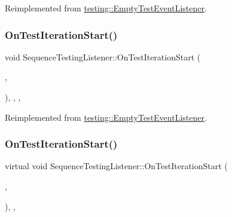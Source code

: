 Reimplemented from \mbox{\hyperlink{classtesting_1_1_empty_test_event_listener_a31edf103561e8b4d747656bc2d927661}{testing\+::\+Empty\+Test\+Event\+Listener}}.

\mbox{\label{class_sequence_testing_listener_a31ffb1bb77e88fff266511b1d8427e20}} 
\subsubsection{\texorpdfstring{OnTestIterationStart()}{OnTestIterationStart()}\hspace{0.1cm}{\footnotesize\ttfamily [2/3]}}
{\footnotesize\ttfamily void Sequence\+Testing\+Listener\+::\+On\+Test\+Iteration\+Start (\begin{DoxyParamCaption}\item[{const \mbox{\hyperlink{classtesting_1_1_unit_test}{Unit\+Test}} \&}]{,  }\item[{int}]{ }\end{DoxyParamCaption})\hspace{0.3cm}{\ttfamily [inline]}, {\ttfamily [override]}, {\ttfamily [protected]}, {\ttfamily [virtual]}}



Reimplemented from \mbox{\hyperlink{classtesting_1_1_empty_test_event_listener_a31edf103561e8b4d747656bc2d927661}{testing\+::\+Empty\+Test\+Event\+Listener}}.

\mbox{\label{class_sequence_testing_listener_a345641262fa10cc4b251ac54116db74b}} 
\subsubsection{\texorpdfstring{OnTestIterationStart()}{OnTestIterationStart()}\hspace{0.1cm}{\footnotesize\ttfamily [3/3]}}
{\footnotesize\ttfamily virtual void Sequence\+Testing\+Listener\+::\+On\+Test\+Iteration\+Start (\begin{DoxyParamCaption}\item[{const \mbox{\hyperlink{classtesting_1_1_unit_test}{Unit\+Test}} \&}]{,  }\item[{int}]{ }\end{DoxyParamCaption})\hspace{0.3cm}{\ttfamily [inline]}, {\ttfamily [protected]}, {\ttfamily [virtual]}}



